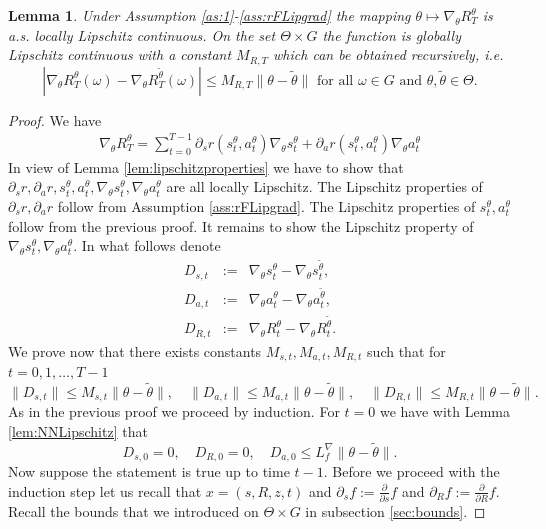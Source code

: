 \documentclass[reqno, 11pt]{amsart}%
\newtheorem{lemma}[theorem]{Lemma}
\theoremstyle{definition}
\begin{document}
\begin{lemma}\label{lem:LRgrad}
Under Assumption \ref{as:1}-\ref{ass:rFLipgrad}
the mapping $\theta \mapsto \nabla_\theta R_T^\theta$ is a.s. locally Lipschitz continuous.  On the set $\Theta\times G$ the function is globally Lipschitz continuous with a constant $M_{R,T}$ which can be obtained recursively, i.e.
$$| \nabla_\theta R_T^\theta(\omega) - \nabla_\theta R_T^{\tilde\theta}(\omega)| \le M_{R,T} \|\theta-\tilde\theta\| \mbox{ for all } \omega \in G \mbox{ and } \theta,\tilde\theta\in\Theta.$$
\end{lemma}

\begin{proof}
We have
\begin{eqnarray}\label{eq:nablaR}
\nabla_\theta R_T^\theta = \sum_{t=0}^{T-1}  \partial_sr(s_t^\theta,a_t^\theta) \nabla_\theta s_t^\theta + \partial_ar(s_t^{\theta},a_t^{\theta}) \nabla_\theta a_t^\theta
\end{eqnarray}
In view of Lemma \ref{lem:lipschitzproperties} we have to show that $\partial_sr, \partial_ar,s_t^\theta, a_t^\theta, \nabla_\theta s_t^\theta , \nabla_\theta a_t^\theta$ are all locally Lipschitz.  The Lipschitz properties of $\partial_sr, \partial_ar$ follow from  Assumption \ref{ass:rFLipgrad}. The Lipschitz properties of $s_t^\theta, a_t^\theta$ follow from the previous proof. It remains to show the Lipschitz property of $\nabla_\theta s_t^\theta , \nabla_\theta a_t^\theta.$ 
In what follows denote
\begin{eqnarray*}
D_{s,t}  &:=& \nabla_\theta s_{t}^\theta- \nabla_\theta s_{t}^{\tilde\theta},\\
D_{a,t} &:=& \nabla_\theta a_t^\theta- \nabla_\theta a_t^{\tilde\theta},\\
D_{R,t}  &:=& \nabla_\theta R_t^\theta- \nabla_\theta R_t^{\tilde\theta}.
\end{eqnarray*}
We prove now that there exists constants $M_{s,t}, M_{a,t}, M_{R,t}$ such that for $t=0,1,\ldots ,T-1$
\begin{equation}\label{eq:deltanablasaR} \| D_{s,t}\| \le M_{s,t} \|\theta-\tilde\theta\|,\quad \| D_{a,t}\| \le M_{a,t}\|\theta-\tilde\theta\|, \quad \| D_{R,t} \| \le M_{R,t}\|\theta-\tilde\theta\|.
\end{equation}
As in the previous proof we proceed by induction.
For $t=0$ we have with Lemma \ref{lem:NNLipschitz} that
$$ D_{s,0} =0, \quad D_{R,0} =0, \quad D_{a,0}\le L_{f}^\nabla \|\theta-\tilde\theta\|. $$
Now suppose the statement is true up to time $t-1$. 
Before we proceed with the induction step let us recall that $x=(s,R,z,t)$ and $\partial_sf := \frac{\partial}{\partial s}f$ and $\partial_Rf := \frac{\partial}{\partial R}f.$   Recall the bounds that we introduced on 
 $\Theta\times G$ in subsection \ref{sec:bounds}.


\end{proof}
\end{document}

